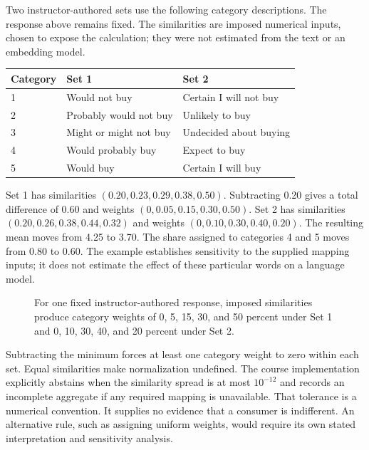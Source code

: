 Two instructor-authored sets use the following category descriptions.
The response above remains fixed. The similarities are imposed numerical
inputs, chosen to expose the calculation; they were not estimated from
the text or an embedding model.

\begin{table}[H]
\centering\small
\begin{tabular}{@{}lll@{}}
\toprule
Category & Set 1 & Set 2 \\
\midrule

1 & Would not buy & Certain I will not buy \\
2 & Probably would not buy & Unlikely to buy \\
3 & Might or might not buy & Undecided about buying \\
4 & Would probably buy & Expect to buy \\
5 & Would buy & Certain I will buy \\
\bottomrule
\end{tabular}
\end{table}

Set 1 has similarities \((0.20,0.23,0.29,0.38,0.50)\). Subtracting 0.20
gives a total difference of 0.60 and weights
\((0,0.05,0.15,0.30,0.50)\). Set 2 has similarities
\((0.20,0.26,0.38,0.44,0.32)\) and weights \((0,0.10,0.30,0.40,0.20)\).
The resulting mean moves from 4.25 to 3.70. The share assigned to
categories 4 and 5 moves from 0.80 to 0.60. The example establishes
sensitivity to the supplied mapping inputs; it does not estimate the
effect of these particular words on a language model.

\begin{figure}[htbp]
\centering

\caption{For one fixed instructor-authored response, imposed similarities produce category weights of 0, 5, 15, 30, and 50 percent under Set 1 and 0, 10, 30, 40, and 20 percent under Set 2.}\label{fig:M05_anchor_ratings}
\end{figure}

Subtracting the minimum forces at least one category weight to zero
within each set. Equal similarities make normalization undefined. The
course implementation explicitly abstains when the similarity spread is
at most \(10^{-12}\) and records an incomplete aggregate if any required
mapping is unavailable. That tolerance is a numerical convention. It
supplies no evidence that a consumer is indifferent. An alternative
rule, such as assigning uniform weights, would require its own stated
interpretation and sensitivity analysis.

